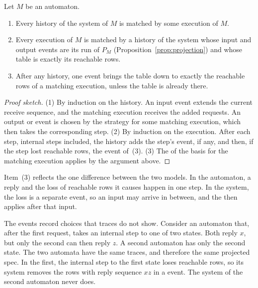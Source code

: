 \begin{proposition}
\label{prop:automaton-system}
Let $M$ be an automaton.
\begin{enumerate}
  \item Every history of the system of $M$ is matched by some execution of
        $M$.
  \item Every execution of $M$ is matched by a history of the system whose
        input and output events are its run of $P_M$
        (Proposition~\ref{prop:projection}) and whose table is exactly its
        reachable rows.
  \item After any history, one \commitment event brings the table down to
        exactly the reachable rows of a matching execution, unless the table
        is already there.
\end{enumerate}
\end{proposition}

\begin{proof}[Proof sketch]
(1) By induction on the history.  An input event extends the current receive
sequence, and the matching execution receives the added requests.  An output
or \commitment event is chosen by the strategy for some matching execution,
which then takes the corresponding step.  (2) By induction on the execution.
After each step, internal steps included, the history adds the step's event,
if any, and then, if the step lost reachable rows, the \commitment event
of~(3).  (3) The \commitment of the basis for the matching execution applies
by the argument above.
\end{proof}

Item~(3) reflects the one difference between the two models.  In the
automaton, a reply and the loss of reachable rows it causes happen in one
step.  In the system, the loss is a separate \commitment event, so an input
may arrive in between, and the \commitment then applies after that input.

The \commitment events record choices that traces do not show.  Consider an
automaton that, after the first request, takes an internal step to one of two
states.  Both reply $x$, but only the second can then reply $z$.  A second
automaton has only the second state.  The two automata have the same traces,
and therefore the same projected spec.  In the first, the internal step to the
first state loses reachable rows, so its system removes the rows with reply
sequence $xz$ in a \commitment event.  The system of the second automaton never
does.

